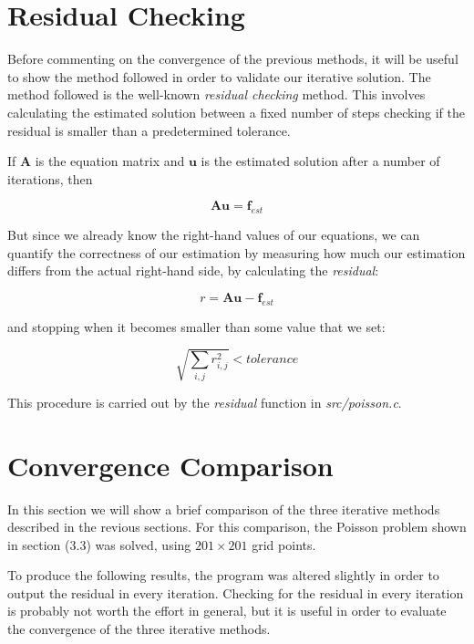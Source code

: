 \documentclass[11pt]{report}
\begin{document}
\section{Residual Checking}
Before commenting on the convergence of the previous methods, it will be useful to show the method followed in order to validate our iterative solution. The method followed is the well-known \emph{residual checking} method. This involves calculating the estimated solution between a fixed number of steps checking if the residual is smaller than a predetermined tolerance.
\newline

If $\bm{A}$ is the equation matrix and $\bm{u}$ is the estimated solution after a number of iterations, then

\begin{equation}
\bm{A} \bm{u} = \bm{f}_{est}
\end{equation}

But since we already know the right-hand values of our equations, we can quantify the correctness of our estimation by measuring how much our estimation differs from the actual right-hand side, by calculating the \emph{residual}:

\begin{equation}
r = \bm{A} \bm{u} - \bm{f}_{est}
\end{equation}

and stopping when it becomes smaller than some value that we set:

\begin{equation}
\sqrt{\sum_{i,j}r_{i,j}^2} < tolerance
\end{equation}

This procedure is carried out by the \emph{residual} function in \emph{src/poisson.c}.

\section{Convergence Comparison}
In this section we will show a brief comparison of the three iterative methods described in the revious sections. For this comparison, the Poisson problem shown in section (3.3) was solved, using $201 \times 201$ grid points.
\newline

To produce the following results, the program was altered slightly in order to output the residual in every iteration. Checking for the residual in every iteration is probably not worth the effort in general, but it is useful in order to evaluate the convergence of the three iterative methods.
\newline
\end{document}
